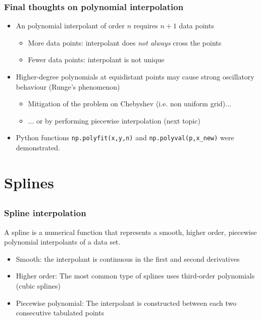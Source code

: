 \begin{frame}
  \frametitle{Final thoughts on polynomial interpolation}
  \begin{itemize}
     \item An polynomial interpolant of order $n$ requires $n+1$ data points
    \begin{itemize}
       \item More data points: interpolant does \emph{not always} cross the points
       \item Fewer data points: interpolant is not unique
    \end{itemize}
     \item Higher-degree polynomials at equidistant points may cause strong oscillatory behaviour (Runge's phenomenon)
    \begin{itemize}
       \item Mitigation of the problem on Chebyshev (i.e. non uniform grid)...
       \item ... or by performing piecewise interpolation (next topic)
    \end{itemize}
     \item Python functions \lstinline$np.polyfit(x,y,n)$ and \lstinline$np.polyval(p,x_new)$ were demonstrated.
  \end{itemize}
\end{frame}

\section{Splines}
\subsection*{}
\begin{frame}
  \frametitle{Spline interpolation}
  A spline is a numerical function that represents a {\color{tuealert}smooth}, {\color{tuealert}higher order}, {\color{tuealert}piecewise polynomial} interpolants of a data set.
  \pause
  \begin{itemize}
     \item Smooth: the interpolant is continuous in the first and second derivatives 
     \item Higher order: The most common type of splines uses third-order polynomials (cubic splines)
     \item Piecewise polynomial: The interpolant is constructed between each two consecutive tabulated points
  \end{itemize}
\end{frame}

